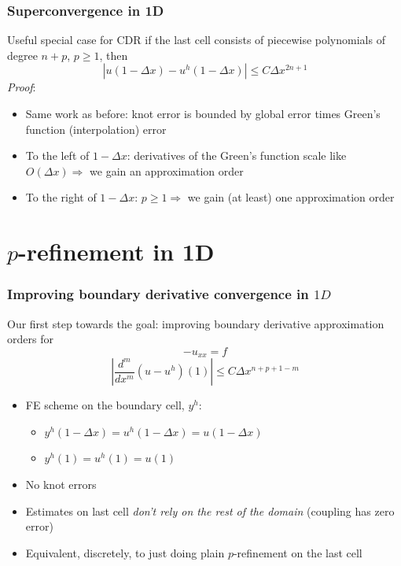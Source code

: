 \documentclass[8pt]{beamer}
\begin{document}
\begin{frame}
    \frametitle{Superconvergence in 1D}
    Useful special case for CDR if the last cell consists of piecewise
    polynomials of degree \(n + p\), \(p \geq 1\), then
    \begin{equation*}
        |u(1 - \Delta x) - u^h(1 - \Delta x)| \leq C \Delta x^{2 n + 1}
    \end{equation*}
    \pause
    \emph{Proof}:
    \begin{itemize}
        \item Same work as before: knot error is bounded by global error times
              Green's function (interpolation) error
        \item To the left of \(1 - \Delta x\): derivatives of the Green's
              function scale like \(O(\Delta x) \Rightarrow\) we gain an
              approximation order
        \item To the right of \(1 - \Delta x\): \(p \geq 1 \Rightarrow\) we gain
              (at least) one approximation order
    \end{itemize}
\end{frame}

\section{\(p\)-refinement in 1D}
\begin{frame}
    \frametitle{Improving boundary derivative convergence in \(1D\)}
    Our first step towards the goal: improving boundary derivative approximation
    orders for
    \begin{equation*}
        -u_{xx} = f
    \end{equation*}
    \pause
    \begin{equation*}
        \left|\dfrac{d^m}{dx^m}(u - u^h)(1)\right|
        \leq C \Delta x^{n + p + 1 - m}
    \end{equation*}
    \pause
    \begin{itemize}
        \item FE scheme on the boundary cell, \(y^h\):
              \begin{itemize}
                  \item \(y^h(1 - \Delta x) = u^h(1 - \Delta x) = u(1 - \Delta x)\)
                  \item \(y^h(1) = u^h(1) = u(1)\)
              \end{itemize}
              \pause
        \item No knot errors
        \item Estimates on last cell \emph{don't rely on the rest of the
              domain} (coupling has zero error)
        \item Equivalent, discretely, to just doing plain \(p\)-refinement on
              the last cell
    \end{itemize}
\end{frame}
\end{document}
